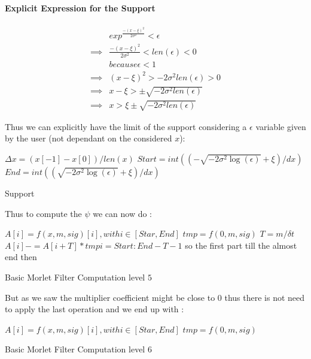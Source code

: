 \documentclass[a4paper]{report}
\begin{document}
\paragraph{Explicit Expression for the Support}

\begin{align*}
& exp^{\frac{-(x-\xi)^2}{2 \sigma^2}}< \epsilon \\
\implies & \frac{-(x-\xi)^2}{2 \sigma^2}< len(\epsilon)<0 \\
& because \epsilon <1 \\
\implies & (x-\xi)^2>-2 \sigma ^2 len(\epsilon) > 0\\
\implies & x-\xi > \pm \sqrt{-2 \sigma ^2 len(\epsilon) }\\
\implies & x> \xi \pm \sqrt{-2 \sigma ^2 len(\epsilon) }
\end{align*}

Thus we can explicitly have the limit of the support considering a $\epsilon$ variable given by the user (not dependant on the considered $x$):
 
\begin{algorithm}[H]
  $\Delta x=(x[-1]-x[0])/len(x)$\;
 $ Start = int((-\sqrt{-2\sigma ^2 \log(\epsilon)}+\xi)/dx)$ \;
 $ End = int((\sqrt{-2\sigma ^2 \log(\epsilon)}+\xi)/dx)$ \; 
 \caption{Support}
\end{algorithm}

Thus to compute the $\psi$ we can now do :

\begin{algorithm}[H]
 \KwResult{$\psi$}
$A[i]=f(x,m,sig)[i] , with i \in [Star,End]$\;
$tmp = f(0,m,sig)$\;
$T=m/\delta t$\;
$A[i]-=A[i+T]*tmp i=Start:End-T-1$ so the first part till the almost end then \;
 \caption{Basic Morlet Filter Computation level $5$}
\end{algorithm}

But as we saw the multiplier coefficient might be close to $0$ thus there is not need to apply the last operation and we end up with :

\begin{algorithm}[H]
 \KwResult{$\psi$}
$A[i]=f(x,m,sig)[i] , with i \in [Star,End]$\;
$tmp = f(0,m,sig)$\;
 \caption{Basic Morlet Filter Computation level $6$}
\end{algorithm}
\end{document}
